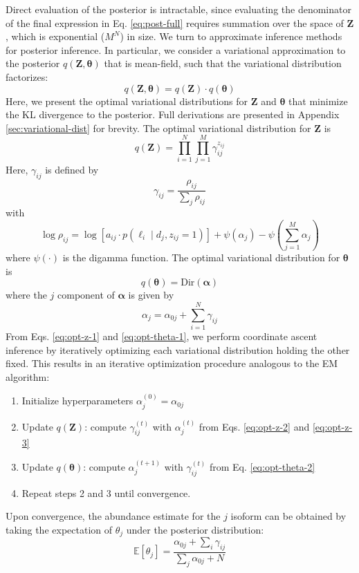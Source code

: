 Direct evaluation of the posterior is intractable, since evaluating the denominator of the final expression in Eq. \ref{eq:post-full} requires summation over the space of $\bm{Z}$, which is exponential ($M^N$) in size. We turn to approximate inference methods for posterior inference. In particular, we consider a variational approximation to the posterior $q(\bm{Z},\bm{\theta})$ that is mean-field, such that the variational distribution factorizes:
\begin{equation}
    q(\bm{Z},\bm{\theta})=q(\bm{Z})\cdot q(\bm\theta)
\end{equation}
Here, we present the optimal variational distributions for $\bm{Z}$ and $\bm\theta$ that minimize the KL divergence to the posterior. Full derivations are presented in Appendix \ref{sec:variational-dist} for brevity. The optimal variational distribution for $\bm{Z}$ is
\begin{equation}\label{eq:opt-z-1}
    q(\bm{Z})=\prod_{i=1}^N\prod_{j=1}^M \gamma_{ij}^{z_{ij}}
\end{equation}
Here, $\gamma_{ij}$ is defined by 
\begin{equation}\label{eq:opt-z-2}
    \gamma_{ij}=\frac{\rho_{ij}}{\sum_j\rho_{ij}}
\end{equation}
with
\begin{equation}\label{eq:opt-z-3}
    \log\rho_{ij}=\log\left[a_{ij}\cdot p(\ell_i\mid d_j,z_{ij}=1)\right]+\psi(\alpha_j)-\psi\left(\sum_{j=1}^M\alpha_j\right)
\end{equation}
where $\psi(\cdot)$ is the digamma function. 
The optimal variational distribution for $\bm\theta$ is
\begin{equation}\label{eq:opt-theta-1}
    q(\bm\theta) = \mathrm{Dir}(\bm\alpha)
\end{equation}
where the $j$ component of $\bm\alpha$ is given by
\begin{equation}\label{eq:opt-theta-2}
    \alpha_j=\alpha_{0j}+\sum_{i=1}^N\gamma_{ij}
\end{equation}
From Eqs. \ref{eq:opt-z-1} and \ref{eq:opt-theta-1}, we perform coordinate ascent inference by iteratively optimizing each variational distribution holding the other fixed. This results in an iterative optimization procedure analogous to the EM algorithm:
\begin{enumerate}
    \item Initialize hyperparameters $\alpha_j^{(0)}=\alpha_{0j}$
    \item Update $q(\bm{Z})$: compute $\gamma_{ij}^{(t)}$  with $\alpha_j^{(t)}$ from Eqs. \ref{eq:opt-z-2} and \ref{eq:opt-z-3}
    \item Update $q(\bm\theta)$: compute $\alpha_{j}^{(t+1)}$  with $\gamma_{ij}^{(t)}$ from Eq. \ref{eq:opt-theta-2}
    \item Repeat steps 2 and 3 until convergence. 
\end{enumerate}
Upon convergence, the abundance estimate for the $j$ isoform can be obtained by taking the expectation of $\theta_j$ under the posterior distribution:
\begin{equation}
    \mathbb{E}[\theta_j] = \frac{\alpha_{0j}+\sum_i\gamma_{ij}}{\sum_j\alpha_{0j}+N}
\end{equation}

